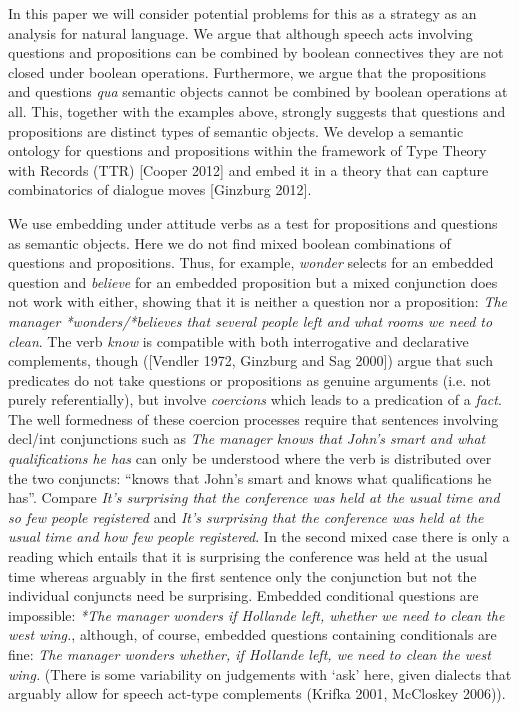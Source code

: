 \documentclass[12pt]{article}
\newcommand{\ignore}[1]{}
\begin{document}
In this paper we will consider potential problems for this as a
strategy as an analysis for natural language. We argue that although
speech acts involving questions
and propositions can be combined by boolean connectives they are not closed under boolean operations.  Furthermore, we argue that the propositions and questions  \textit{qua} semantic
objects cannot be combined by boolean operations at all. This, together with
the examples above, strongly suggests that questions and propositions are distinct
types of semantic objects. We develop a semantic ontology for questions and propositions within the framework of Type Theory with Records (TTR) [Cooper 2012] and embed it in a theory  that can capture combinatorics of dialogue moves [Ginzburg 2012].



We use embedding under attitude verbs as a test for propositions and
questions as semantic objects.  Here we do not find mixed
boolean combinations of questions and propositions.  Thus, for
example, \textit{wonder} selects for an embedded question and
\textit{believe} for an embedded proposition but a mixed conjunction
does not work with either, showing that it is neither a question nor a proposition: \textit{The manager *wonders/*believes that several  people left and what rooms we need to
clean}.  The verb \textit{know} is compatible with both interrogative
and declarative complements, though ([Vendler 1972, Ginzburg and Sag 2000]) \ignore{\cite{vendler72,gs00}} argue that such predicates do not take
questions or propositions as genuine arguments (i.e. not purely
referentially), but involve {\it coercions}   which leads to a predication of a {\it fact}.
The well formedness of these coercion processes require  that sentences involving decl/int conjunctions such as \textit{The manager knows that John's smart and what    qualifications he has} can only be understood where the verb is  distributed over the two conjuncts: ``knows that John's smart and  knows what qualifications he has''.  Compare \textit{It's surprising
    that the conference was held at the usual time and so few people
    registered} and \textit{It's surprising that the conference was
    held at the usual time and how few people registered}.  In the
  second mixed case there is only a reading which entails that it is
  surprising the conference was held at the usual time whereas
  arguably in the first sentence only the conjunction but not the
  individual conjuncts need be surprising.  Embedded conditional questions are
  impossible: \textit{*The manager wonders if Hollande left, whether we need to
    clean the west wing.}, although, of course, embedded questions
  containing conditionals are fine:  \textit{The manager wonders whether, if Hollande left, we need to    clean the west wing.} (There is some variability on judgements with `ask' here, given dialects that arguably allow for  speech act-type complements (Krifka 2001, McCloskey 2006)).
\end{document}
